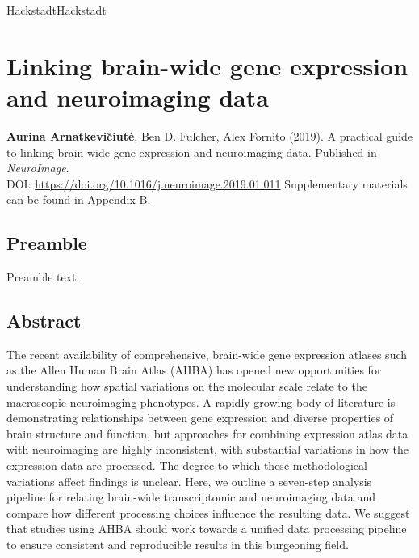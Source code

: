 HackstadtHackstadt%
\chapter{Linking brain-wide gene expression and neuroimaging data}
\label{ch:Chapter4}



\textbf{Aurina Arnatkevi\u{c}i\={u}t\.{e}},
Ben D. Fulcher,
Alex Fornito (2019).
A practical guide to linking brain-wide gene expression and neuroimaging data. Published in \textit{
NeuroImage}.\\
DOI: \url{https://doi.org/10.1016/j.neuroimage.2019.01.011} %
Supplementary materials can be found in Appendix B.


\section*{Preamble}
Preamble text.

\newpage

\section*{Abstract}
The recent availability of comprehensive, brain-wide gene expression atlases such as the Allen Human Brain Atlas (AHBA) has opened new opportunities for understanding how spatial variations on the molecular scale relate to the macroscopic neuroimaging phenotypes. A rapidly growing body of literature is demonstrating relationships between gene expression and diverse properties of brain structure and function, but approaches for combining expression atlas data with neuroimaging are highly inconsistent, with substantial variations in how the expression data are processed. The degree to which these methodological variations affect findings is unclear. Here, we outline a seven-step analysis pipeline for relating brain-wide transcriptomic and neuroimaging data and compare how different processing choices influence the resulting data. We suggest that studies using AHBA should work towards a unified data processing pipeline to ensure consistent and reproducible results in this burgeoning field.

